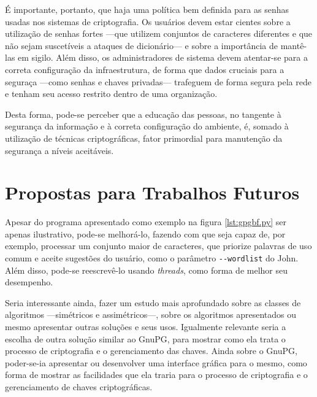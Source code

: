 \documentclass[12px,a4paper,twoside]{article}
\begin{document}
É importante, portanto, que haja uma política bem definida para as senhas
usadas nos sistemas de criptografia.  Os usuários devem estar cientes sobre a
utilização de senhas fortes ---que utilizem conjuntos de caracteres diferentes
e que não sejam suscetíveis a ataques de dicionário--- e sobre a importância de
mantê-las em sigilo.  Além disso, os administradores de sistema devem
atentar-se para a correta configuração da infraestrutura, de forma que dados
cruciais para a seguraça ---como senhas e chaves privadas--- trafeguem de forma
segura pela rede e tenham seu acesso restrito dentro de uma organização.

Desta forma, pode-se perceber que a educação das pessoas, no tangente à
segurança da informação e à correta configuração do ambiente, é, somado à
utilização de técnicas criptográficas, fator primordial para manutenção da
segurança a níveis aceitáveis.


\section{Propostas para Trabalhos Futuros}
\label{sec:propostas}
Apesar do programa apresentado como exemplo na figura \ref{lst:gpgbf.py} ser
apenas ilustrativo, pode-se melhorá-lo, fazendo com que seja capaz de, por
exemplo, processar um conjunto maior de caracteres, que priorize palavras de
uso comum e aceite sugestões do usuário, como o parâmetro \texttt{-{}-wordlist}
do John.  Além disso, pode-se reescrevê-lo usando \textit{threads}, como forma
de melhor seu desempenho.

Seria interessante ainda, fazer um estudo mais aprofundado sobre as classes de
algoritmos ---simétricos e assimétricos---, sobre os algoritmos apresentados ou
mesmo apresentar outras soluções e seus usos.  Igualmente relevante seria a
escolha de outra solução similar ao GnuPG, para mostrar como ela trata o
processo de criptografia e o gerenciamento das chaves.  Ainda sobre o GnuPG,
poder-se-ia apresentar ou desenvolver uma interface gráfica para o mesmo, como
forma de mostrar as facilidades que ela traria para o processo de criptografia
e o gerenciamento de chaves criptográficas.


%


\end{document}
